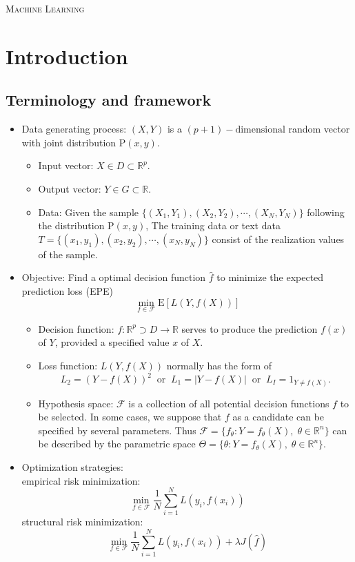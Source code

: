 \documentclass{report}
\theoremstyle{nonumberplain}
\begin{document}
	\begin{center}	
	\vspace{1em} 
	\textsc{\Huge Machine Learning}	
	\end{center}


\chapter{Introduction}

\section{Terminology and framework}

\begin{itemize}
	\item Data generating process: $(X,Y)$ is a $(p+1)-\text{dimensional}$ random vector with joint distribution $\mathrm{P}(x,y)$.
	\begin{itemize}
		\item Input vector: $X\in D\subset\mathbb{R}^p$.
		\item Output vector: $Y\in G\subset\mathbb{R}$.
		\item Data: Given the sample $\{(X_1,Y_1),(X_2,Y_2),\cdots,(X_N,Y_N)\}$ following the distribution $\mathrm{P}(x,y)$, The training data or text data $T=\{(x_1,y_1),(x_2,y_2),\cdots,(x_N,y_N)\}$ consist of the realization values of the sample.
	\end{itemize}	
	\item Objective: Find a optimal decision function $\hat{f}$ to minimize the expected prediction loss (EPE)
	\[
	\min_{f\in\mathcal{F}}\mathrm{E}[L(Y,f(X))]
	\]
	\begin{itemize}
		\item Decision function: $f:\mathbb{R}^p\supset D\longrightarrow\mathbb{R}$ serves to produce the prediction $f(x)$ of $Y$, provided a specified value $x$ of $X$. 
		\item Loss function: $L(Y,f(X))$ normally has the form of 
		\[
		L_2=(Y-f(X))^2\ \text{ or }\ L_1=|Y-f(X)|\ \text{ or }\ L_I=1_{Y\ne f(X)}.
		\]
		\item Hypothesis space: $\mathcal{F}$ is a collection of all potential decision functions $f$ to be selected. In some cases, we suppose that $f$ as a candidate can be specified by several parameters. Thus $\mathcal{F}=\{f_\theta:Y=f_\theta(X),\;\theta\in\mathbb{R}^n\}$ can be described by the parametric space $\Theta=\{\theta:Y=f_\theta(X),\;\theta\in\mathbb{R}^n\}$.
	\end{itemize}
	\item Optimization strategies: \\
	empirical risk minimization:
	\[
	\min_{f\in\mathcal{F}}\frac{1}{N}\sum_{i=1}^{N}L(y_i,f(x_i))
	\]
	structural risk minimization:
	\[
	\min_{f\in\mathcal{F}}\frac{1}{N}\sum_{i=1}^{N}L(y_i,f(x_i))+\lambda J(\hat{f})
	\]
\end{itemize} 
\end{document}
